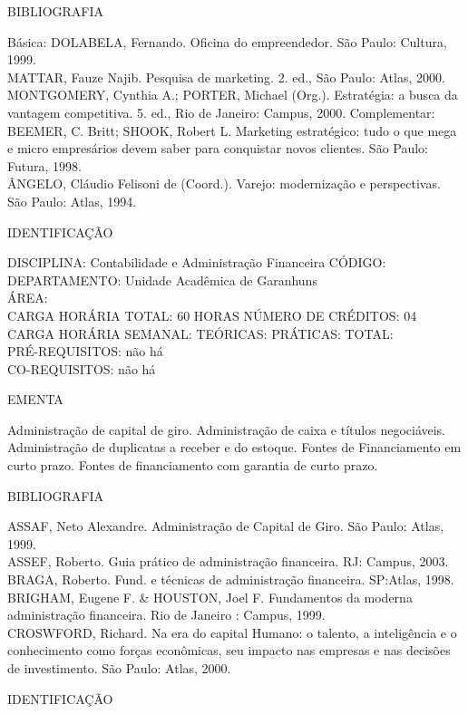 \documentclass[
	12pt,				%
	openright,			%
  oneside,     %
	a4paper,			%
	english,			%
	french,				%
	spanish,			%
	brazil				%
	]{abntex2}
\begin{document}
\begin{apendicesenv}
BIBLIOGRAFIA 

Básica:
DOLABELA, Fernando. Oficina do empreendedor. São Paulo: Cultura, 1999.\\
MATTAR, Fauze Najib. Pesquisa de marketing. 2. ed., São Paulo: Atlas,
2000.\\
MONTGOMERY, Cynthia A.; PORTER, Michael (Org.). Estratégia: a busca da
vantagem competitiva. 5. ed., Rio de Janeiro: Campus, 2000.
Complementar:\\
BEEMER, C. Britt; SHOOK, Robert L. Marketing estratégico: tudo o que
mega e micro empresários devem saber para conquistar novos clientes.
São Paulo: Futura, 1998.\\
ÂNGELO, Cláudio Felisoni de (Coord.). Varejo: modernização e
perspectivas. São Paulo: Atlas, 1994.

\newpage IDENTIFICAÇÃO

DISCIPLINA: Contabilidade e Administração Financeira CÓDIGO:\\ 
DEPARTAMENTO: Unidade Acadêmica de Garanhuns\\
ÁREA: \\
CARGA HORÁRIA TOTAL: 60 HORAS NÚMERO DE CRÉDITOS: 04\\
CARGA HORÁRIA SEMANAL: TEÓRICAS: PRÁTICAS: TOTAL: \\
PRÉ-REQUISITOS: não há\\
CO-REQUISITOS: não há

EMENTA 

Administração de capital de giro. Administração de caixa e títulos
negociáveis. Administração de duplicatas a receber e do estoque. Fontes
de Financiamento em curto prazo. Fontes de financiamento com garantia
de curto prazo.

BIBLIOGRAFIA 

ASSAF, Neto Alexandre. Administração de Capital de Giro. São Paulo:
Atlas, 1999.\\
ASSEF, Roberto. Guia prático de administração financeira. RJ: Campus,
2003.\\
BRAGA, Roberto. Fund. e técnicas de administração financeira. SP:Atlas,
1998.\\
BRIGHAM, Eugene F. \& HOUSTON, Joel F. Fundamentos da moderna
administração financeira. Rio de Janeiro : Campus, 1999.\\
CROSWFORD, Richard. Na era do capital Humano: o talento, a inteligência
e o conhecimento como forças econômicas, seu impacto nas empresas e nas
decisões de investimento. São Paulo: Atlas, 2000.

\newpage IDENTIFICAÇÃO


\end{apendicesenv}
\end{document}
